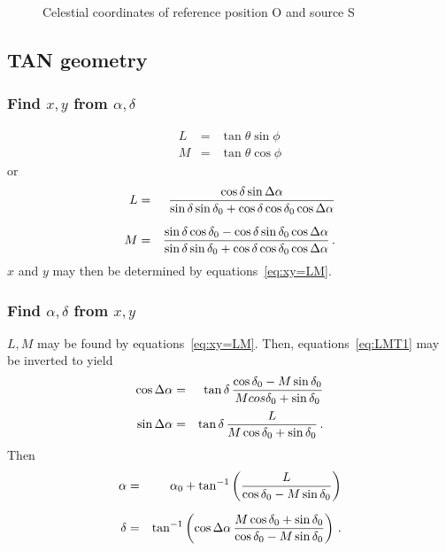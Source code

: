 
\begin{figure}
\centerline{}
\caption{Celestial coordinates of reference position O and source
           S}\label{fig:celestial}
\end{figure}

\subsection{TAN geometry}
\subsubsection{Find $x,y$ from $\alpha,\delta$}
\begin{eqnarray*}
  L & = & \tan\theta \sin\phi  \\
  M & = & \tan\theta \cos\phi
\end{eqnarray*}
or
\begin{eqnarray}
  L & = & \frac{\cos\delta\sin\da}{\sin\delta\sin\delta_0 +
          \cos\delta \cos\delta_0 \cos\da} \nonumber\\
  \noalign{\vskip 6pt}
  M & = & \frac{\sin\delta \cos\delta_0-\cos\delta \sin\delta_0
          \cos\da}{\sin\delta\sin\delta_0 +
          \cos\delta\cos\delta_0 \cos\da} \, .
\label{eq:LMT1}
\end{eqnarray}
$x$ and $y$ may then be determined by equations~\ref{eq:xy=LM}.

\subsubsection{Find $\alpha,\delta$ from $x,y$}

$L,M$ may be found by equations~\ref{eq:xy=LM}. Then,
equations~\ref{eq:LMT1} may be inverted to yield
\begin{eqnarray*}
 \cos\da & = & \tan\delta \, \frac{\cos\delta_0 -
        M\sin\delta_0}{M cos\delta_0+\sin\delta_0} \\
 \noalign{\vskip 2pt}
 \sin\da & = & \tan\delta \, \frac{L}{M
                      \cos\delta_0+\sin\delta_0} \, .
\end{eqnarray*}
Then
\begin{eqnarray*}
 \alpha &= & \alpha_0+\tan^{-1} \left( \frac{L}{\cos\delta_0 -
             M \sin\delta_0} \right) \\
 \noalign{\vskip 6pt}
 \delta & = &\tan^{-1} \left( \cos\da\, \frac{M\cos\delta_0
             +\sin\delta_0}{\cos\delta_0-M \sin\delta_0} \right) \,.
\end{eqnarray*}


